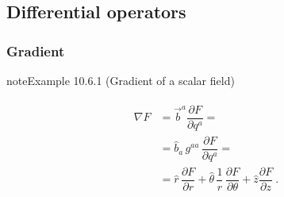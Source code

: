 \documentclass[letterpaper,10pt,english]{jupyterBook}
\begin{document}
\subsection{Differential operators}
\label{\detokenize{ch/tensor-algebra-calculus/calculus-euclidean-cylindrical:differential-operators}}\label{\detokenize{ch/tensor-algebra-calculus/calculus-euclidean-cylindrical:tensor-calculus-cylindrical-differential-operators}}

\subsubsection{Gradient}
\label{\detokenize{ch/tensor-algebra-calculus/calculus-euclidean-cylindrical:gradient}}\label{\detokenize{ch/tensor-algebra-calculus/calculus-euclidean-cylindrical:tensor-calculus-cylindrical-differential-operators-gradient}}\label{ch/tensor-algebra-calculus/calculus-euclidean-cylindrical:example-0}
\begin{sphinxadmonition}{note}{Example 10.6.1 (Gradient of a scalar field)}


\begin{equation*}
\begin{split}\begin{aligned}
  \nabla F 
  & = \vec{b}^a \dfrac{\partial F}{\partial q^a} = \\
  & = \hat{b}_a \, g^{aa} \, \dfrac{\partial F}{\partial q^a} = \\
  & = \hat{r} \, \dfrac{\partial F}{\partial  r} 
    + \hat{\theta} \, \dfrac{1}{r} \, \dfrac{\partial F}{\partial \theta}  
    + \hat{z} \dfrac{\partial F}{\partial z} \ . 
\end{aligned}\end{split}
\end{equation*}\end{sphinxadmonition}
\label{ch/tensor-algebra-calculus/calculus-euclidean-cylindrical:example-1}
\end{document}
